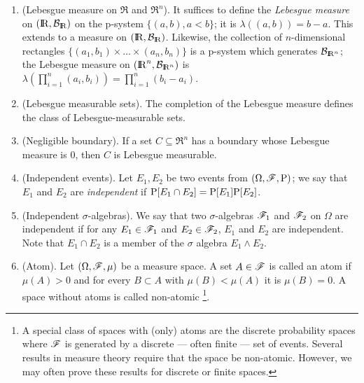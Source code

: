 \documentclass[a4paper,10pt]{article}
\begin{document}
\begin{enumerate}
 \item (Lebesgue measure on $\Re$ and $\Re^n$). It suffices to define the \textit{Lebesgue measure} on $(\Re,\B_\Re)$
       on the p-system $\{(a,b), a<b\}$; it is $\lambda((a,b))=b - a$. This extends to a measure on  $(\Re,\B_\Re)$.
       Likewise, the collection of $n$-dimensional rectangles $\{(a_1, b_1)\times\ldots \times (a_n, b_n)\}$ is a p-system
       which generates $\B_{\Re^n}$; the Lebesgue measure on $(\Re^n, \B_{\Re^n})$ is 
       $\lambda(\prod_{i=1}^n (a_i, b_i))=\prod_{i=1}^n (b_i-a_i)$.
 
 \item (Lebesgue measurable sets). The completion of the Lebesgue measure defines the class of Lebesgue-measurable
       sets. 
             
 \item (Negligible boundary). If a set $C\subseteq \Re^n$ has a boundary whose Lebesgue measure is $0$, then 
       $C$ is Lebesgue measurable.
       
 \item (Independent events). Let $E_1,E_2$ be two events from $(\Omega,\mathscr{F},\mathrm{P})$; we say that $E_1$ and $E_2$ are \textit{independent}
       if $\mathrm{P}[E_1\cap E_2] = \mathrm{P}[E_1]\mathrm{P}[E_2]$.
       
 \item (Independent $\sigma$-algebras). We say that two $\sigma$-algebras $\mathscr{F}_1$ and $\mathscr{F}_2$ on $\Omega$ 
       are independent if for any $E_1\in \mathscr{F}_1$ and $E_2\in\mathscr{F}_2$, $E_1$ and $E_2$ are independent.
       Note that $E_1\cap E_2$ is a member of the $\sigma$ algebra $E_1 \wedge E_2$.
       
 \item (Atom). Let $(\Omega, \mathscr{F}, \mu)$ be a measure space. A set $A\in\mathscr{F}$ is called an atom if
       $\mu(A)>0$ and for every $B\subset A$ with $\mu(B)<\mu(A)$ it is $\mu(B)=0$.
       A space without atoms is called non-atomic%
	    \footnote{A special class of spaces with (only) atoms are the discrete probability spaces where
	              $\mathscr{F}$ is generated by a discrete --- often finite --- set of events. Several 
	              results in measure theory require that the space be non-atomic. However, we may
	              often prove these results for discrete or finite spaces.}.
\end{enumerate}
\end{document}
